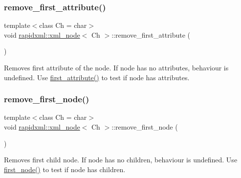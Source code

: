 \subsubsection{\texorpdfstring{remove\+\_\+first\+\_\+attribute()}{remove\_first\_attribute()}}
{\footnotesize\ttfamily template$<$class Ch = char$>$ \\
void \hyperlink{classrapidxml_1_1xml__node}{rapidxml\+::xml\+\_\+node}$<$ Ch $>$\+::remove\+\_\+first\+\_\+attribute (\begin{DoxyParamCaption}{ }\end{DoxyParamCaption})\hspace{0.3cm}{\ttfamily [inline]}}

Removes first attribute of the node. If node has no attributes, behaviour is undefined. Use \hyperlink{classrapidxml_1_1xml__node_ab816ab6f13ee4b0588d5b76b0697511c}{first\+\_\+attribute()} to test if node has attributes. \mbox{\label{classrapidxml_1_1xml__node_a62bf7b276cf7a651a3337f5e0a0ef6ac}} 
\subsubsection{\texorpdfstring{remove\+\_\+first\+\_\+node()}{remove\_first\_node()}}
{\footnotesize\ttfamily template$<$class Ch = char$>$ \\
void \hyperlink{classrapidxml_1_1xml__node}{rapidxml\+::xml\+\_\+node}$<$ Ch $>$\+::remove\+\_\+first\+\_\+node (\begin{DoxyParamCaption}{ }\end{DoxyParamCaption})\hspace{0.3cm}{\ttfamily [inline]}}

Removes first child node. If node has no children, behaviour is undefined. Use \hyperlink{classrapidxml_1_1xml__node_acdf3691224d683f50692616a92a75d3f}{first\+\_\+node()} to test if node has children. \mbox{\label{classrapidxml_1_1xml__node_a1781a2cbedc9a51d609ad5b528125635}} 
